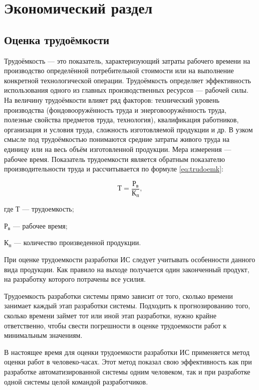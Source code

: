 \section{Экономический раздел}

\subsection{Оценка трудоёмкости}

Трудоёмкость --- это  показатель, характеризующий затраты рабочего времени на производство определённой потребительной стоимости или на выполнение конкретной технологической операции\cite{marks}.
Трудоёмкость определяет эффективность использования одного из главных производственных ресурсов — рабочей силы. На величину трудоёмкости влияет ряд факторов: технический уровень производства (фондовооружённость труда и энерговооружённость труда, полезные свойства предметов труда, технология), квалификация работников, организация и условия труда, сложность изготовляемой продукции и др.
В узком смысле под трудоёмкостью понимаются средние затраты живого труда на единицу или на весь объём изготовленной продукции. Мера измерения --- рабочее время.
Показатель трудоемкости является обратным показателю производительности труда и рассчитывается по формуле \ref{eq:trudoemk}:

\begin{equation}
	\label{eq:trudoemk}
	Т = \frac{Р_{в}}{К_{п}},
\end{equation}
\begin{ESKDexplanation}
	\item где $Т$ --- трудоемкость;
	\item $Р_{в}$ --- рабочее время;
	\item $К_{п}$ --- количество произведенной продукции.
\end{ESKDexplanation}

При оценке трудоемкости разработки ИС следует учитывать особенности данного вида продукции.
Как правило на выходе получается один законченный продукт, на разработку которого потрачены все усилия.

Трудоемкость разработки системы прямо зависит от того, сколько времени занимает каждый этап разработки системы. Подходить к прогнозированию того, сколько времени займет тот или иной этап разработки, нужно крайне ответственно, чтобы свести погрешности в оценке трудоемкости работ к минимальным значениям.

В настоящее время для оценки трудоемкости разработки ИС применяется метод оценки работ в человеко-часах. Этот метод показал свою эффективность как при разработке автоматизированной системы одним человеком, так и при разработке одной системы целой командой разработчиков.

